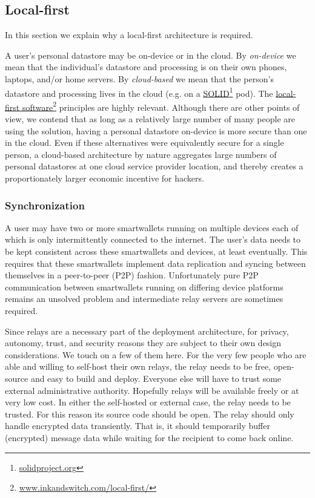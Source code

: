 \documentclass[11pt, oneside]{article}   	%
\newcommand{\hyperfootnote}[1][]{\def\ArgI{{#1}}\hyperfootnoteRelay}
\newcommand\hyperfootnoteRelay[2][]{\href{#1#2}{\ArgI}\footnote{\href{#1#2}{#2}}}
\begin{document}
\subsection{Local-first}

In this section we explain why a local-first architecture is required. 

A user's personal datastore may be on-device or in the cloud. By \emph{on-device} we mean that the individual's datastore and processing is on their own phones, laptops, and/or home servers. By \emph{cloud-based} we mean that the person's datastore and processing lives in the cloud (e.g. on a \hyperfootnote[SOLID][https://]{solidproject.org} pod). The \hyperfootnote[local-first software][https://]{www.inkandswitch.com/local-first/} principles are highly relevant. Although there are other points of view, we contend that as long as a relatively large number of many people are using the solution, having a personal datastore on-device is more secure than one in the cloud. Even if these alternatives were equivalently secure for a single person, a cloud-based architecture by nature aggregates large numbers of personal datastores at one cloud service provider location, and thereby creates a proportionately larger economic incentive for hackers. 

\subsubsection{Synchronization}

A user may have two or more smartwallets running on multiple devices each of which is only intermittently connected to the internet. The user's data needs to be kept consistent across these smartwallets and devices, at least eventually. This requires that these smartwallets implement data replication and syncing between themselves in a peer-to-peer (P2P) fashion. Unfortunately pure P2P communication between smartwallets running on differing device platforms remains an unsolved problem and intermediate relay servers are sometimes required. 

Since relays are a necessary part of the deployment architecture, for privacy, autonomy, trust, and security reasons they are subject to their own design considerations. We touch on a few of them here. For the very few people who are able and willing to self-host their own relays, the relay needs to be free, open-source and easy to build and deploy. Everyone else will have to trust some external administrative authority. Hopefully relays will be available freely or at very low cost. In either the self-hosted or external case, the relay needs to be trusted. For this reason its source code should be open. The relay should only handle encrypted data transiently. That is, it should temporarily buffer (encrypted) message data while waiting for the recipient to come back online.
\end{document}
